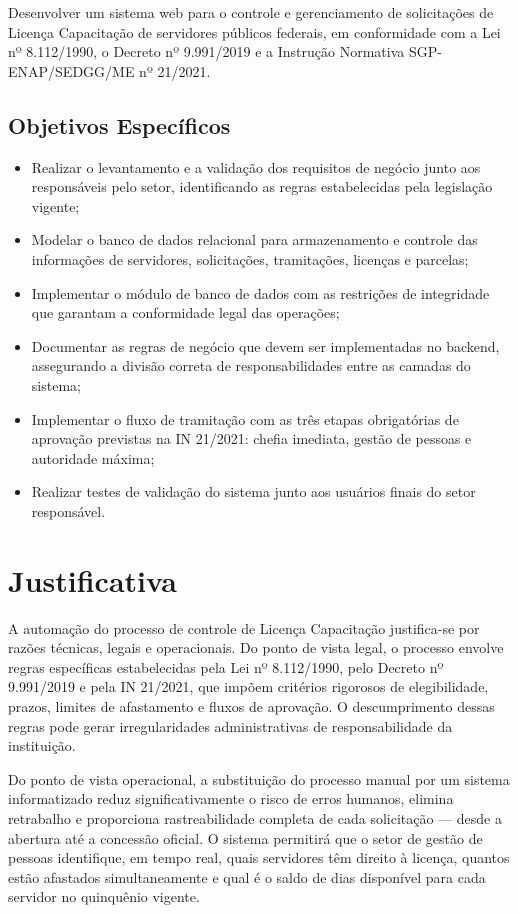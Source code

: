 Desenvolver um sistema web para o controle e gerenciamento de solicitações de Licença Capacitação de servidores públicos federais, em conformidade com a Lei nº 8.112/1990, o Decreto nº 9.991/2019 e a Instrução Normativa SGP-ENAP/SEDGG/ME nº 21/2021.

\subsection{Objetivos Específicos}

\begin{itemize}
    \item Realizar o levantamento e a validação dos requisitos de negócio junto aos responsáveis pelo setor, identificando as regras estabelecidas pela legislação vigente;
    \item Modelar o banco de dados relacional para armazenamento e controle das informações de servidores, solicitações, tramitações, licenças e parcelas;
    \item Implementar o módulo de banco de dados com as restrições de integridade que garantam a conformidade legal das operações;
    \item Documentar as regras de negócio que devem ser implementadas no backend, assegurando a divisão correta de responsabilidades entre as camadas do sistema;
    \item Implementar o fluxo de tramitação com as três etapas obrigatórias de aprovação previstas na IN 21/2021: chefia imediata, gestão de pessoas e autoridade máxima;
    \item Realizar testes de validação do sistema junto aos usuários finais do setor responsável.
\end{itemize}

\section{Justificativa}

A automação do processo de controle de Licença Capacitação justifica-se por razões técnicas, legais e operacionais. Do ponto de vista legal, o processo envolve regras específicas estabelecidas pela Lei nº 8.112/1990, pelo Decreto nº 9.991/2019 e pela IN 21/2021, que impõem critérios rigorosos de elegibilidade, prazos, limites de afastamento e fluxos de aprovação. O descumprimento dessas regras pode gerar irregularidades administrativas de responsabilidade da instituição.

Do ponto de vista operacional, a substituição do processo manual por um sistema informatizado reduz significativamente o risco de erros humanos, elimina retrabalho e proporciona rastreabilidade completa de cada solicitação — desde a abertura até a concessão oficial. O sistema permitirá que o setor de gestão de pessoas identifique, em tempo real, quais servidores têm direito à licença, quantos estão afastados simultaneamente e qual é o saldo de dias disponível para cada servidor no quinquênio vigente.

